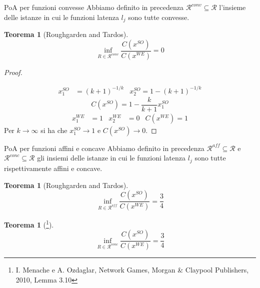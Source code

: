 \documentclass{beamer}
\newcounter{counter1}
\theoremstyle{plain}
\newtheorem{myteo}[counter1]{Teorema}
\theoremstyle{definition}
\theoremstyle{remark}
\newcommand{\pa}[1]{\left(#1\right)}
\begin{document}
\begin{frame}{PoA per funzioni convesse}
  Abbiamo definito in precedenza $\mathcal{R}^{conv} \subseteq
  \mathcal{R}$ l'insieme delle istanze in cui le funzioni latenza
  $l_j$ sono tutte convesse.
  \begin{myteo}[Roughgarden and Tardos]
    \[ \inf _{R\in \mathcal{R}^{conv}} \frac{C\pa{ x^{SO}}}{C\pa{
          x^{WE}}} = 0 \]
  \end{myteo}
\end{frame}

\begin{frame}
  \begin{proof}
    \begin{center}
    \end{center}
    \vspace{-25px}
    \begin{align*}
      x^{SO}_1 &= \pa{k+1}^{-1/k} & x^{SO}_2 = 1- \pa{k+1}^{-1/k}
    \end{align*}
    \[ C\pa{x^{SO}} = 1 - \frac{k}{k+1}x^{SO}_1 \]
    \begin{align*}
      x^{WE}_1 &= 1 & x^{WE}_2 &= 0 & C\pa{x^{WE}} = 1
    \end{align*}
    Per $k\to \infty$ si ha che $x^{SO}_1 \to 1$ e $C\pa{x^{SO}}\to 0$.
  \end{proof}
\end{frame}

\begin{frame}{PoA per funzioni affini e concave}
  Abbiamo definito in precedenza
  $\mathcal{R}^{aff} \subseteq \mathcal{R}$ e $\mathcal{R}^{conc}
  \subseteq \mathcal{R}$  gli insiemi delle istanze in
  cui le funzioni latenza $l_j$ sono tutte rispettivamente affini e concave.
  \begin{myteo}[Roughgarden and Tardos]
    \[ \inf _{R\in \mathcal{R}^{aff}} \frac{C\pa{ x^{SO}}}{C\pa{
          x^{WE}}} = \frac{3}{4} \]
  \end{myteo}
  \begin{myteo}[\footnote{I. Menache e A. Ozdaglar, Network Games,
      Morgan \& Claypool Publishers, 2010, Lemma 3.10}]
    \[ \inf _{R\in \mathcal{R}^{conc}} \frac{C\pa{ x^{SO}}}{C\pa{
          x^{WE}}} = \frac{3}{4} \]
  \end{myteo}
\end{frame}
\end{document}
